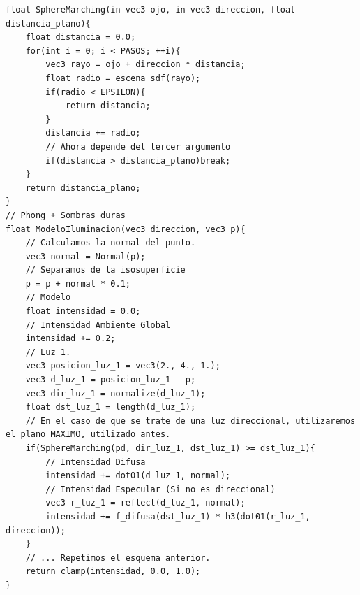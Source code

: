 \newpage
\begin{lstlisting}
float SphereMarching(in vec3 ojo, in vec3 direccion, float distancia_plano){
    float distancia = 0.0;
    for(int i = 0; i < PASOS; ++i){
        vec3 rayo = ojo + direccion * distancia;
        float radio = escena_sdf(rayo);
        if(radio < EPSILON){
            return distancia;
        }
        distancia += radio;
        // Ahora depende del tercer argumento
        if(distancia > distancia_plano)break;
    }
    return distancia_plano;
}
// Phong + Sombras duras
float ModeloIluminacion(vec3 direccion, vec3 p){
    // Calculamos la normal del punto.
    vec3 normal = Normal(p);
    // Separamos de la isosuperficie
    p = p + normal * 0.1;
    // Modelo
    float intensidad = 0.0;
    // Intensidad Ambiente Global
    intensidad += 0.2;
    // Luz 1.
    vec3 posicion_luz_1 = vec3(2., 4., 1.);
    vec3 d_luz_1 = posicion_luz_1 - p;
    vec3 dir_luz_1 = normalize(d_luz_1);
    float dst_luz_1 = length(d_luz_1);
    // En el caso de que se trate de una luz direccional, utilizaremos el plano MAXIMO, utilizado antes.
    if(SphereMarching(pd, dir_luz_1, dst_luz_1) >= dst_luz_1){
        // Intensidad Difusa
        intensidad += dot01(d_luz_1, normal);
        // Intensidad Especular (Si no es direccional)
        vec3 r_luz_1 = reflect(d_luz_1, normal);
        intensidad += f_difusa(dst_luz_1) * h3(dot01(r_luz_1, direccion));
    }
    // ... Repetimos el esquema anterior.
    return clamp(intensidad, 0.0, 1.0);
}
\end{lstlisting}
\newpage
